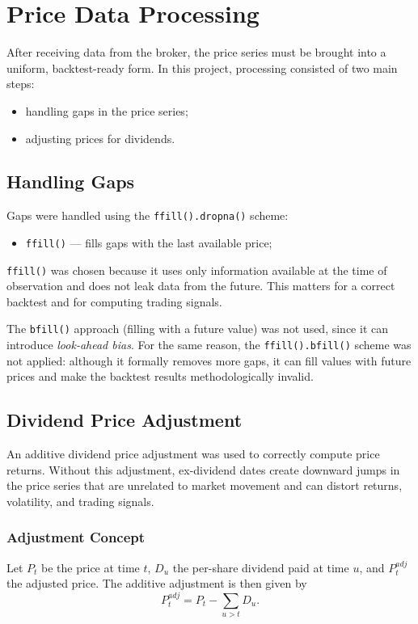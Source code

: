 \documentclass[12pt]{article}
\begin{document}
\section{Price Data Processing}

After receiving data from the broker, the price series must be brought into a uniform, backtest-ready form. In this project, processing consisted of two main steps:
\begin{itemize}
    \item handling gaps in the price series;
    \item adjusting prices for dividends.
\end{itemize}

\subsection*{Handling Gaps}

Gaps were handled using the \texttt{ffill().dropna()} scheme:
\begin{itemize}
    \item \texttt{ffill()} --- fills gaps with the last available price;
\end{itemize}

\texttt{ffill()} was chosen because it uses only information available at the time of observation and does not leak data from the future. This matters for a correct backtest and for computing trading signals.

The \texttt{bfill()} approach (filling with a future value) was not used, since it can introduce \textit{look-ahead bias}. For the same reason, the \texttt{ffill().bfill()} scheme was not applied: although it formally removes more gaps, it can fill values with future prices and make the backtest results methodologically invalid.

\subsection*{Dividend Price Adjustment}

An additive dividend price adjustment was used to correctly compute price returns. Without this adjustment, ex-dividend dates create downward jumps in the price series that are unrelated to market movement and can distort returns, volatility, and trading signals.

\subsubsection*{Adjustment Concept}
Let $P_t$ be the price at time $t$, $D_u$ the per-share dividend paid at time $u$, and $P_t^{adj}$ the adjusted price. The additive adjustment is then given by
\[
P_t^{adj} = P_t - \sum_{u>t} D_u.
\]
\end{document}
